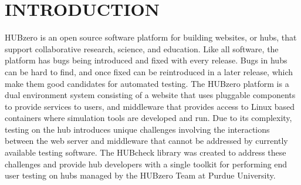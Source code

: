 %
%
%



\chapter{INTRODUCTION}
\label{chap:introduction}






HUBzero is an open source software platform for building websites, or hubs,
that support collaborative research, science, and education.  Like all
software, the platform has bugs being introduced and fixed with every release.
Bugs in hubs can be hard to find, and once fixed can be reintroduced in a later
release, which make them good candidates for automated testing. The HUBzero
platform is a dual environment system consisting of a website that uses
pluggable components to provide services to users, and middleware that provides
access to Linux based containers where simulation tools are developed and run.
Due to its complexity, testing on the hub introduces unique challenges
involving the interactions between the web server and middleware that cannot be
addressed by currently available testing software.  The HUBcheck library was
created to address these challenges and provide hub developers with a single
toolkit for performing end user testing on hubs managed by the HUBzero Team at
Purdue University.

